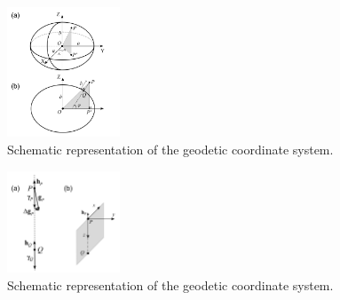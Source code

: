 \documentclass[manuscript]{geophysics}
\begin{document}

\begin{figure}
    \centering
    \includegraphics[width=0.3\textwidth]{figures/geodetic_coordinates.png}
    \caption{Schematic representation of the geodetic coordinate
    system.}
  \label{fig:fig1}
\end{figure}

\begin{figure}
    \centering
    \includegraphics[width=0.3\textwidth]{figures/gravitational_disturbance.png}
    \caption{Schematic representation of the geodetic coordinate
    system.}
  \label{fig:fig2}
\end{figure}
\end{document}
